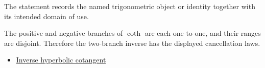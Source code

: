 \begin{remark*}[Interpretation]
The statement records the named trigonometric object or identity together with
its intended domain of use.
\end{remark*}

\begin{remark*}[Proof]
The positive and negative branches of $\operatorname{coth}$ are each
one-to-one, and their ranges are disjoint. Therefore the two-branch inverse
has the displayed cancellation laws.
\end{remark*}
\begin{dependencies}
\begin{itemize}
  \item \hyperref[def:inverse-hyperbolic-cotangent]{Inverse hyperbolic cotangent}
\end{itemize}
\end{dependencies}

